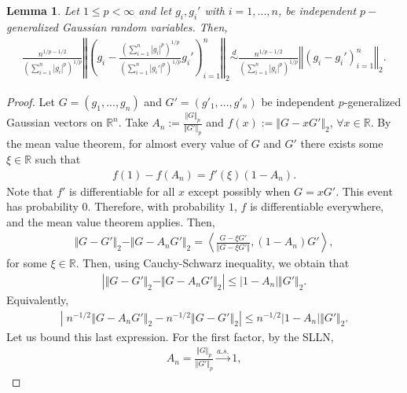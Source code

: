 \documentclass[10pt]{amsart}
\newtheorem{lemma}{Lemma}[section]
\newcounter{theor}
\def\R{\mathbb{R}}
\numberwithin{equation}{section}
\begin{document}
\begin{lemma}
\label{LemEquivalentCLTBoundarypball}
Let $1\leq p <\infty$ and let $g_i, g_i'$ with $i=1,...,n$, be independent $p-$generalized Gaussian random variables. Then,
\begin{align*}
\frac{n^{1/p - 1/2}}{\left(\sum _{i=1}^n \left| g_i  \right|^p \right)^{1/p}} \left\Vert   \left( g_i - 
 \frac{\left(\sum _{i=1}^n \left| g_i  \right|^p  \right)^{1/p} }{\left(\sum _{i=1}^n \left| g_i'  \right|^p \right)^{1/p}} g_i' \right)_{i=1}^n \right\Vert _2 \overset{d}{\sim} \frac{n^{1/p - 1/2}}{\left(\sum _{i=1}^n \left| g_i  \right|^p \right)^{1/p}} \left\Vert   \left( g_i - 
   g_i' \right)_{i=1}^n \right\Vert _2 .
\end{align*}
\end{lemma}

\begin{proof}
Let $G=(g_1,...,g_n)$ and $G'=(g'_1,...,g'_n)$ be independent $p$-generalized Gaussian vectors on $\R^n$.
Take $A_n := \frac{\Vert G \Vert _p}{\Vert G' \Vert _p} $ and $f(x) := \Vert G - xG' \Vert_2$, $\forall x \in \R$. By the mean value theorem, for almost every value of $G$ and $G'$ there exists some $\xi \in \R$ such that
\begin{align*}
f(1) - f(A_n) =  f'(\xi) (1- A_n).
\end{align*}
Note that $f'$ is differentiable for all $x$ except possibly when $G = xG'$. This event has probability $0$. Therefore, with probability $1$, $f$ is differentiable everywhere, and the mean value theorem applies.
Then,
\begin{align*}
\Vert G - G' \Vert_2 - \Vert G - A_n G' \Vert_2  = \left\langle \frac{G-\xi G'}{\Vert G - \xi G' \Vert} ,  (1- A_n) G' \right\rangle,
\end{align*}
for some $\xi \in \R$. Then, using Cauchy-Schwarz inequality, we obtain that
\begin{align*}
\left| \Vert G - G' \Vert_2 - \Vert G - A_n G' \Vert_2 \right|  \leq  | 1- A_n| \Vert G' \Vert_2.
\end{align*}
Equivalently,
\begin{align*}
\left| \; n^{-1/2}\left\Vert  G - A_n G' \right\Vert_2 - n^{-1/2} \left\Vert  G - G'  \right\Vert_2 \right| \leq n^{-1/2} | 1- A_n| \Vert G' \Vert_2.
\end{align*}
Let us bound this last expression. For the first factor, by the SLLN,
\begin{align*}
A_n = \frac{\Vert G \Vert _p}{\Vert G' \Vert _p}  \overset{a.s.}{\to} 1,
\end{align*}

\end{proof}
\end{document}
